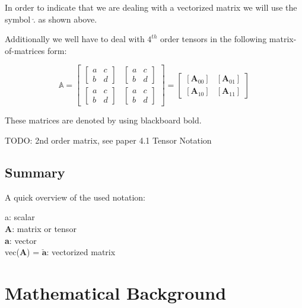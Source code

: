 In order to indicate that we are dealing with a vectorized matrix we will use the symbol $\check{.}$ as shown above.

Additionally we well have to deal with $4^{th}$ order tensors in the following matrix-of-matrices form:

\[
\mathbb{A} = 
\left[\begin{array}{cc}{\begin{bmatrix} a & c \\ b & d \end{bmatrix}} & {\begin{bmatrix} a & c \\ b & d \end{bmatrix}} \\ {\begin{bmatrix} a & c \\ b & d \end{bmatrix}} & {\begin{bmatrix} a & c \\ b & d \end{bmatrix}}\end{array}\right]
=
\left[\begin{array}{cc}{\left[\mathbf{A}_{00}\right]} & {\left[\mathbf{A}_{01}\right]} \\ {\left[\mathbf{A}_{10}\right]} & {\left[\mathbf{A}_{11}\right]}\end{array}\right]
\]

These matrices are denoted by using blackboard bold.

TODO: 2nd order matrix, see paper 4.1 Tensor Notation

\subsection{Summary}
A quick overview of the used notation:

\begin{addmargin}[2cm]{2cm}
a: scalar \\
\textbf{A}: matrix or tensor \\
\textbf{a}: vector \\
vec(\textbf{A}) = $\boldsymbol{\check{a}}$: vectorized matrix \\
\end{addmargin}

\section{Mathematical Background}

